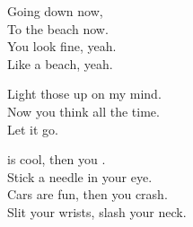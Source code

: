 Going down now, \\
To the beach now. \\
You look fine, yeah. \\
Like a beach, yeah. \\




Light those up on my mind. \\
Now you think all the time. \\

Let it go. \\




 is cool, then you . \\
Stick a needle in your eye. \\
Cars are fun, then you crash. \\
Slit your wrists, slash your neck. \\

